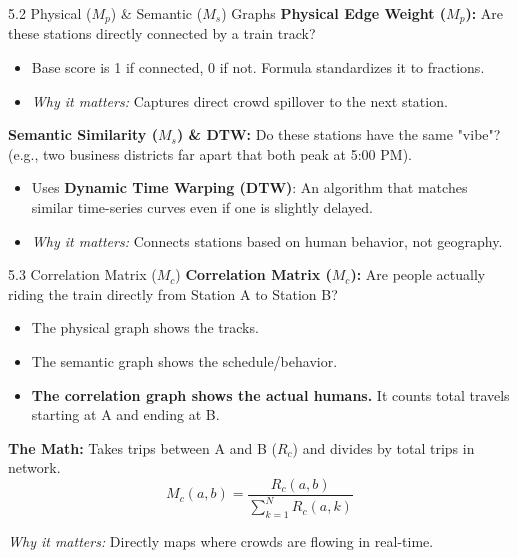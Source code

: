 \documentclass[aspectratio=169]{beamer}
\begin{document}
\begin{frame}{5.2 Physical ($M_p$) \& Semantic ($M_s$) Graphs}
    \small
    \textbf{Physical Edge Weight ($M_p$):} 
    Are these stations directly connected by a train track?
    \begin{itemize}
        \item Base score is 1 if connected, 0 if not. Formula standardizes it to fractions.
        \item \textit{Why it matters:} Captures direct crowd spillover to the next station.
    \end{itemize}

    \vspace{0.3cm}
    \textbf{Semantic Similarity ($M_s$) \& DTW:}
    Do these stations have the same "vibe"? (e.g., two business districts far apart that both peak at 5:00 PM).
    \begin{itemize}
        \item Uses \textbf{Dynamic Time Warping (DTW)}: An algorithm that matches similar time-series curves even if one is slightly delayed.
        \item \textit{Why it matters:} Connects stations based on human behavior, not geography.
    \end{itemize}
\end{frame}

\begin{frame}{5.3 Correlation Matrix ($M_c$)}
    \textbf{Correlation Matrix ($M_c$):}
    Are people actually riding the train directly from Station A to Station B? 
    
    \begin{itemize}
        \item The physical graph shows the tracks.
        \item The semantic graph shows the schedule/behavior.
        \item \textbf{The correlation graph shows the actual humans.} It counts total travels starting at A and ending at B.
    \end{itemize}
    
    \textbf{The Math:} 
    Takes trips between A and B ($R_c$) and divides by total trips in network.
    $$M_{c}(a,b)=\frac{R_{c}(a,b)}{\sum_{k=1}^{N}R_{c}(a,k)}$$
    
    \textit{Why it matters:} Directly maps where crowds are flowing in real-time.
\end{frame}

\end{document}
